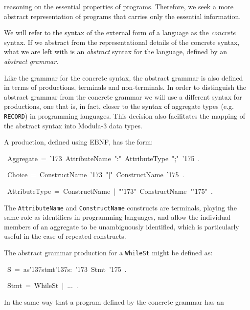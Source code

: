 {{reasoning on the essential properties of programs. Therefore, we seek
a more abstract representation of programs that carries only the
essential information.
\par
We will refer to the syntax of the external form of a language as the
{\it concrete} syntax. If we abstract from the representational
details of the concrete syntax, what we are left with is an {\it
abstract} syntax for the language, defined by an {\it abstract
grammar}.
\par
Like the grammar for the concrete syntax, the abstract grammar is also
defined in terms of productions, terminals and non-terminals. In order
to distinguish the abstract grammar from the concrete grammar we will
use a different syntax for productions, one that is, in fact, closer
to the syntax of aggregate types (e.g. {\tt RECORD}) in programming
languages.  This decision also facilitates the mapping of the abstract
syntax into Modula-3 data types.
\par
A production, defined using EBNF, has the form:
\par
\par{}\noindent\par
{\display ~Aggregate~=~\char'173{}~AttributeName~":"~AttributeType~";"~\char'175{}~.}\noindent\par
{\display ~Choice~=~ConstructName~\char'173{}~"|"~ConstructName~\char'175{}~.}\noindent\par
{\display ~AttributeType~=~ConstructName~|~"\char'173{}"~ConstructName~"\char'175{}"~.}\noindent\par
\medskip\noindent%
The {\tt AttributeName} and {\tt ConstructName} constructs are terminals,
playing the same role as identifiers in programming languages, and
allow the individual members of an aggregate to be unambiguously
identified, which is particularly useful in the case of repeated
constructs.
\par
The abstract grammar production for a {\tt WhileSt} might be defined as:
\par
\par{}\noindent\par
{\display ~S~=~as\char'137{}stmt\char'137{}s:~\char'173{}~Stmt~\char'175{}~.}\noindent\par
{\display ~Stmt~=~WhileSt~|~...~.}\noindent\par
\medskip\noindent%
In the same way that a program defined by the concrete grammar has an
}}
